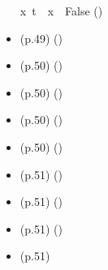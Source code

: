 \begin{isabellebody}
\begin{isamarkuptext}
\begin{itemize}
{{\isacharparenleft}{\isasymforall}x{\isachardot}\ t\ {\isasymnoteq}\ x{\isacharparenright}\ {\isacharequal}\ False} 
      \hfill ()
    \item (p.49)  
      \hfill ()
    \item (p.50)  
      \hfill ()
    \item (p.50)  
      \hfill ()
    \item (p.50)  
      \hfill ()
    \item (p.50)  
      \hfill ()
    \item (p.51)  
      \hfill ()
    \item (p.51)  
      \hfill ()
    \item (p.51)  
      \hfill ()
    \item (p.51)  

\end{itemize}
\end{isamarkuptext}
\end{isabellebody}

